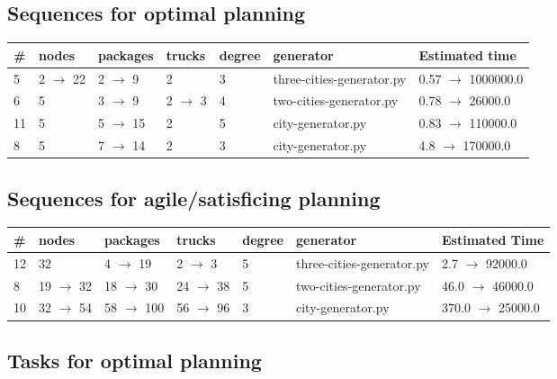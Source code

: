 \documentclass{article}
\begin{document}
                            \subsection*{Sequences for optimal planning}

                            \begin{center}
                            \begin{tabular}{@{}l|l|l|l|l|l|l@{}}
                            \# & nodes & packages & trucks & degree & generator & Estimated time\\\midrule
                            5&2 $\rightarrow$ 22&2 $\rightarrow$ 9&2&3&three-cities-generator.py&0.57 $\rightarrow$ 1000000.0\\
6&5&3 $\rightarrow$ 9&2 $\rightarrow$ 3&4&two-cities-generator.py&0.78 $\rightarrow$ 26000.0\\
11&5&5 $\rightarrow$ 15&2&5&city-generator.py&0.83 $\rightarrow$ 110000.0\\
8&5&7 $\rightarrow$ 14&2&3&city-generator.py&4.8 $\rightarrow$ 170000.0
                            \end{tabular}
                            \end{center}
                    
                         \subsection*{Sequences for agile/satisficing planning}

                        \begin{center}
                        \begin{tabular}{@{}l|l|l|l|l|l|l@{}}
                        \# & nodes & packages & trucks & degree & generator & Estimated Time\\\midrule
                        12&32&4 $\rightarrow$ 19&2 $\rightarrow$ 3&5&three-cities-generator.py&2.7 $\rightarrow$ 92000.0\\
8&19 $\rightarrow$ 32&18 $\rightarrow$ 30&24 $\rightarrow$ 38&5&two-cities-generator.py&46.0 $\rightarrow$ 46000.0\\
10&32 $\rightarrow$ 54&58 $\rightarrow$ 100&56 $\rightarrow$ 96&3&city-generator.py&370.0 $\rightarrow$ 25000.0
                        \end{tabular}
                        \end{center}
                    
                                \subsection*{Tasks for optimal planning}
                                
\end{document}
